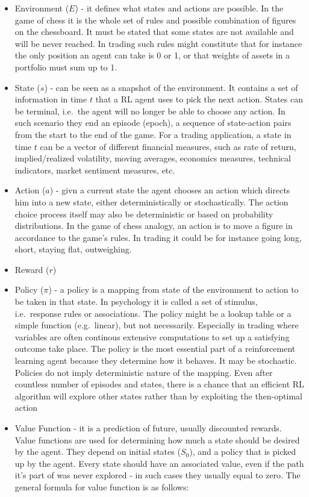 \documentclass[]{article}
\begin{document}
\begin{itemize}
\item
  Environment (\(E\)) - it defines what states and actions are possible.
  In the game of chess it is the whole set of rules and possible
  combination of figures on the chessboard. It must be stated that some
  states are not available and will be never reached. In trading such
  rules might constitute that for instance the only position an agent
  can take is 0 or 1, or that weights of assets in a portfolio must sum
  up to 1.
\item
  State (\(s\)) - can be seen as a snapshot of the environment. It
  contains a set of information in time \(t\) that a RL agent uses to
  pick the next action. States can be terminal, i.e.~the agent will no
  longer be able to choose any action. In such scenario they end an
  episode (epoch), a sequence of state-action pairs from the start to
  the end of the game. For a trading application, a state in time \(t\)
  can be a vector of different financial measures, such as rate of
  return, implied/realized volatility, moving averages, economics
  measures, technical indicators, market sentiment measures, etc.
\item
  Action (\(a\)) - givn a current state the agent chooses an action
  which directs him into a new state, either deterministically or
  stochastically. The action choice process itself may also be
  deterministic or based on probability distributions. In the game of
  chess analogy, an action is to move a figure in accordance to the
  game's rules. In trading it could be for instance going long, short,
  staying flat, outweighing.
\item
  Reward (\(r\))
\item
  Policy (\(\pi\)) - a policy is a mapping from state of the environment
  to action to be taken in that state. In psychology it is called a set
  of stimulus, i.e.~response rules or associations. The policy might be
  a lookup table or a simple function (e.g.~linear), but not
  necessarily. Especially in trading where variables are often continous
  extensive computations to set up a satisfying outcome take place. The
  policy is the most essential part of a reinforcement learning agent
  because they determine how it behaves. It may be stochastic. Policies
  do not imply deterministic nature of the mapping. Even after countless
  number of episodes and states, there is a chance that an efficient RL
  algorithm will explore other states rather than by exploiting the
  then-optimal action
\item
  Value Function - it is a prediction of future, usually discounted
  rewards. Value functions are used for determining how much a state
  should be desired by the agent. They depend on initial states
  (\(S_0\)), and a policy that is picked up by the agent. Every state
  should have an associated value, even if the path it's part of was
  never explored - in such cases they usually equal to zero. The general
  formula for value function is as follows:
\end{itemize}
\end{document}
